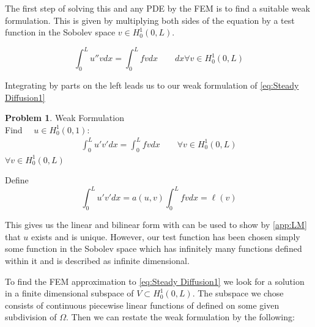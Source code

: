 \documentclass{uonmathreport}
\theoremstyle{definition}
\theoremstyle{problem}
\newtheorem{problem}{Problem}[section]
\theoremstyle{theorem}
\begin{document}
The first step of solving this and any PDE by the FEM is to find a suitable weak formulation. This is given by multiplying both sides of the equation by a test function in the Sobolev space $v \in H^1_0(0, L)$.

\begin{equation*}
\int_0^L  u'' v  dx = \int_0^L  f v dx 	\quad \quad  dx \forall v \in H^1_0(0, L)
\end{equation*}

Integrating by parts on the left leads us to our weak formulation of \ref{eq:Steady Diffusion1}

\begin{problem}{Weak Formulation} \label{prob:Weak Formulation Elliptic}
\\Find $\quad u \in H^1_0(0, 1)$:
\begin{align*}
\int_0^L  u' v'  dx =   \int_0^L  f v dx  \quad \quad  \forall v \in H^1_0(0, L)
\end{align*}
$\forall v \in H^1_0(0, L)$
\end{problem}

Define 
\begin{equation*}
\int_0^L  u' v'  dx = a(u, v)  	
\int_0^L  f v dx  =  \ell(v)
\end{equation*}

This gives us the linear and bilinear form with can be used to show by \ref{app:LM} that $u$ exists and is unique. However, our test function has been chosen simply some function in the Sobolev space which has infinitely many functions defined within it and is described as infinite dimensional. 

To find the FEM approximation to \ref{eq:Steady Diffusion1} we look for a solution in a finite dimensional subspace of $V\subset H^1_0(0, L) $. The subspace we chose consists of continuous piecewise linear functions of defined on some given subdivision of $\Omega$. Then we can restate the weak formulation by the following:
\end{document}
